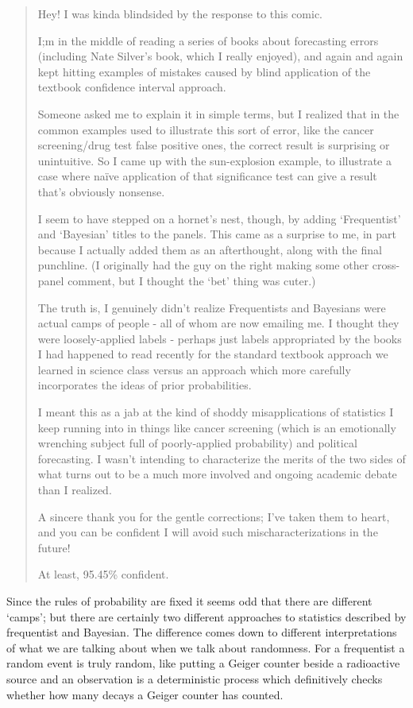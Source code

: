 \documentclass[12pt]{article}
\begin{document}
\begin{quote}
Hey! I was kinda blindsided by the response to this comic.

I;m in the middle of reading a series of books about forecasting
errors (including Nate Silver's book, which I really enjoyed), and
again and again kept hitting examples of mistakes caused by blind
application of the textbook confidence interval approach.

Someone asked me to explain it in simple terms, but I realized that in
the common examples used to illustrate this sort of error, like the
cancer screening/drug test false positive ones, the correct result is
surprising or unintuitive. So I came up with the sun-explosion
example, to illustrate a case where na\"{i}ve application of that
significance test can give a result that's obviously nonsense.

I seem to have stepped on a hornet's nest, though, by adding
\lq{}Frequentist\rq{} and \lq{}Bayesian\rq{} titles to the
panels. This came as a surprise to me, in part because I actually
added them as an afterthought, along with the final punchline. (I
originally had the guy on the right making some other cross-panel
comment, but I thought the \lq{}bet\rq{} thing was cuter.)

The truth is, I genuinely didn't realize Frequentists and Bayesians
were actual camps of people - all of whom are now emailing me. I thought
they were loosely-applied labels - perhaps just labels appropriated by
the books I had happened to read recently for the standard textbook
approach we learned in science class versus an approach which more
carefully incorporates the ideas of prior probabilities.

I meant this as a jab at the kind of shoddy misapplications of
statistics I keep running into in things like cancer screening (which
is an emotionally wrenching subject full of poorly-applied
probability) and political forecasting. I wasn't intending to
characterize the merits of the two sides of what turns out to be a
much more involved and ongoing academic debate than I realized.

A sincere thank you for the gentle corrections; I've taken them to
heart, and you can be confident I will avoid such mischaracterizations
in the future!

At least, 95.45\% confident.
\end{quote}

Since the rules of probability are fixed it seems odd that there are
different \lq{}camps\rq{}; but there are certainly two different
approaches to statistics described by frequentist and Bayesian. The
difference comes down to different interpretations of what we are
talking about when we talk about randomness. For a frequentist a
random event is truly random, like putting a Geiger counter beside a
radioactive source and an observation is a deterministic process which
definitively checks whether how many decays a Geiger counter has
counted. 
\end{document}
